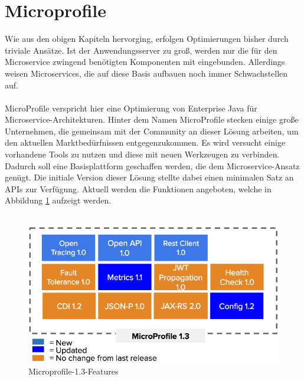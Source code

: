 \section{Microprofile}
Wie aus den obigen Kapiteln hervorging, erfolgen Optimierungen bisher durch triviale Ansätze. Ist der Anwendungsserver zu groß, werden nur die für den Microservice zwingend benötigten Komponenten mit eingebunden. Allerdings weisen Microservices, die auf diese Basis aufbauen noch immer Schwachstellen auf. \\ \\
MicroProfile verspricht hier eine Optimierung von Enterprise Java für Microservice-Architekturen. Hinter dem Namen MicroProfile stecken einige große Unternehmen, die gemeinsam mit der Community an dieser Lösung arbeiten, um den aktuellen Marktbedürfnissen entgegenzukommen. Es wird versucht einige vorhandene Tools zu nutzen und diese mit neuen Werkzeugen zu verbinden. Dadurch soll eine Basisplattform geschaffen werden, die dem Microservice-Ansatz genügt. Die initiale Version dieser Lösung stellte dabei einen minimalen Satz an APIs zur Verfügung. Aktuell werden die Funktionen angeboten, welche in Abbildung \ref{fig:features1.3} aufzeigt werden.  \\ \\
\begin{figure}[h!]
	\centering
	\includegraphics[width=1.0\linewidth]{images/Microprofile13}
	\caption{Microprofile-1.3-Features \cite{Microprofile.2017}} %
	\label{fig:features1.3}
\end{figure}
